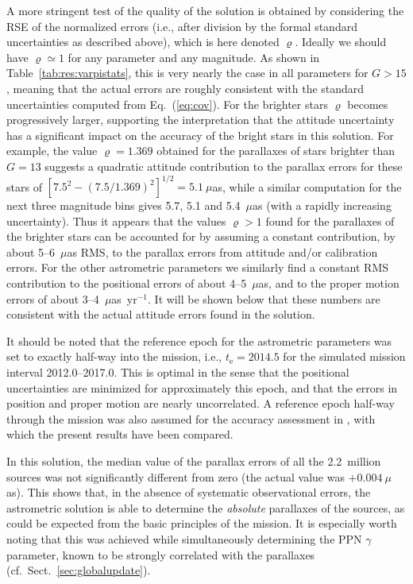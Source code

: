 \documentclass[structabstract]{aa}
\begin{document}
A more stringent test of the quality of the solution is obtained by 
considering the RSE of the normalized errors (i.e., after division by the formal
standard uncertainties as described above), which is here denoted
$\varrho$. Ideally we should have $\varrho\simeq 1$ for any parameter and
any magnitude. As shown in Table~\ref{tab:res:varpistats}, this is very nearly
the case in all parameters for $G>15$, meaning that the actual 
errors are roughly consistent with the standard uncertainties computed from
Eq.~(\ref{eq:cov}). For the brighter stars $\varrho$ becomes progressively larger,
supporting the interpretation that the attitude uncertainty has a significant
impact on the accuracy of the bright stars in this solution. For example, 
the value $\varrho=1.369$ obtained for the parallaxes of stars brighter than
$G=13$ suggests a quadratic attitude contribution to the parallax errors for 
these stars of $[7.5^2-(7.5/1.369)^2]^{1/2}=5.1~\mu$as, while a similar 
computation for the next three magnitude bins gives 5.7, 5.1 and 
5.4~$\mu$as (with a rapidly increasing uncertainty). Thus it appears that the
values $\varrho>1$ found for the parallaxes of the brighter stars can be 
accounted for by assuming a constant contribution, by about 5--6~$\mu$as RMS,
to the parallax errors from attitude and/or calibration errors. For the other
astrometric parameters we similarly find a constant RMS contribution to the 
positional errors of about 4--5~$\mu$as, and to the proper motion errors of about 
3--4~$\mu$as~yr$^{-1}$. It will be shown below
that these numbers are consistent with the actual attitude errors found in the solution. 

It should be noted that the reference epoch for the astrometric parameters
was set to exactly half-way into the mission, i.e., $t_\text{e}=2014.5$ for
the simulated mission interval 2012.0--2017.0. This is optimal in the sense 
that the positional uncertainties are minimized for approximately this epoch, 
and that the errors in position and proper motion are nearly uncorrelated. 
A reference epoch half-way through the mission was also assumed for the 
accuracy assessment in \citet{iaus261:LL}, with which the present results
have been compared.

In this solution, the median value of the parallax errors of all the 2.2~million 
sources was not significantly different from zero (the actual value was $+0.004~\mu$as).
This shows that, in the absence of systematic observational errors, the astrometric 
solution is able to determine the \emph{absolute} parallaxes of the sources, as
could be expected from the basic principles of the mission. It is especially worth
noting that this was achieved while simultaneously determining the PPN $\gamma$ 
parameter, known to be strongly correlated with the parallaxes 
(cf.\ Sect.~\ref{sec:globalupdate}).
\end{document}
